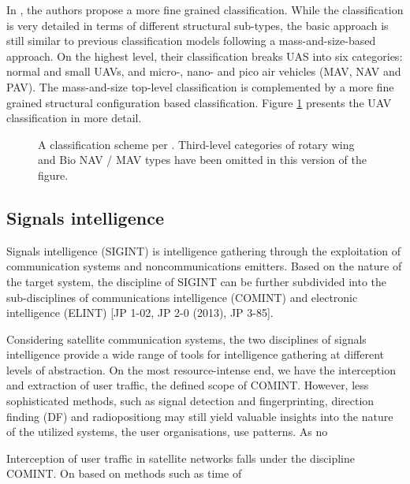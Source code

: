 \documentclass[english, 12pt, a4paper, elec, utf8, a-1b, online]{aaltothesis}
\begin{document}
In \cite{hassanalian2017classifications}, the authors propose a more fine grained classification. While the classification is very detailed in terms of different structural sub-types, the basic approach is still similar to previous classification models following a mass-and-size-based approach. On the highest level, their classification breaks UAS into six categories: normal and small UAVs, and micro-, nano- and pico air vehicles (MAV, NAV and PAV). The mass-and-size top-level classification is complemented by a more fine grained structural configuration based classification. Figure \ref{fig-hassanalian-uas-classification} presents the UAV classification in more detail.

\begin{figure}[h]
  \centering
  
  \caption{A classification scheme per \cite{hassanalian2017classifications}. Third-level categories of rotary wing and Bio NAV / MAV types have been omitted in this version of the figure.}
  \label{fig-hassanalian-uas-classification}
\end{figure}



\subsection{Signals intelligence}
Signals intelligence (SIGINT) is intelligence gathering through the exploitation of communication systems and noncommunications emitters.
Based on the nature of the target system, the discipline of SIGINT can be further subdivided into the sub-disciplines of communications intelligence (COMINT) and electronic intelligence (ELINT) \cite{national2015bulk} [JP 1-02, JP 2-0 (2013), JP 3-85].

Considering satellite communication systems, the two disciplines of signals intelligence provide a wide range of tools for intelligence gathering at different levels of abstraction.
On the most resource-intense end, we have the interception and extraction of user traffic, the defined scope of COMINT.
However, less sophisticated methods, such as signal detection and fingerprinting, direction finding (DF) and radiopositiong may still yield valuable insights into the nature of the utilized systems, the user organisations, use patterns.
As no 

Interception of user traffic in satellite networks falls under the discipline COMINT. On  based on methods such as time of 
\end{document}
